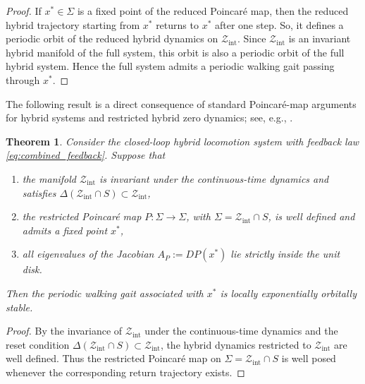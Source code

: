 \documentclass[letterpaper, 10 pt, conference]{ieeeconf}
\newtheorem{theorem}{Theorem}
\begin{document}
{\begin{proof}
If $x^\ast\in\Sigma$ is a fixed point of the reduced Poincaré map, then the reduced hybrid trajectory starting from $x^\ast$ returns to $x^\ast$ after one step. So, it defines a periodic orbit of the reduced hybrid dynamics on $\mathcal Z_{\mathrm{int}}$. Since $\mathcal Z_{\mathrm{int}}$ is an invariant hybrid manifold of the full system, this orbit is also a periodic orbit of the full hybrid system. Hence the full system admits a periodic walking gait passing through $x^\ast$.
\end{proof}


The following result is a direct consequence of standard Poincaré-map arguments for hybrid systems and restricted hybrid zero dynamics; see, e.g., \cite{morris2005restricted, Westervelt2007}.

\begin{theorem}
Consider the closed-loop hybrid locomotion system with feedback law \eqref{eq:combined_feedback}. Suppose that
\begin{enumerate}
\item the manifold $\mathcal Z_{\mathrm{int}}$ is invariant under the continuous-time dynamics and satisfies $\Delta(\mathcal Z_{\mathrm{int}}\cap S)\subset \mathcal Z_{\mathrm{int}}$,
\item the restricted Poincaré map $P:\Sigma\to\Sigma$, with $\Sigma=\mathcal Z_{\mathrm{int}}\cap S$, is well defined and admits a fixed point $x^\ast$,
\item all eigenvalues of the Jacobian $A_P:=DP(x^\ast)$ lie strictly inside the unit disk.
\end{enumerate}
Then the periodic walking gait associated with $x^\ast$ is locally exponentially orbitally stable.
\end{theorem}

\begin{proof}
By the invariance of $\mathcal Z_{\mathrm{int}}$ under the continuous-time dynamics and the reset condition $\Delta(\mathcal Z_{\mathrm{int}}\cap S)\subset \mathcal Z_{\mathrm{int}}$, the hybrid dynamics restricted to $\mathcal Z_{\mathrm{int}}$ are well defined. Thus the restricted Poincaré map on $\Sigma=\mathcal Z_{\mathrm{int}}\cap S$ is well posed whenever the corresponding return trajectory exists.



\end{proof}}
\end{document}
